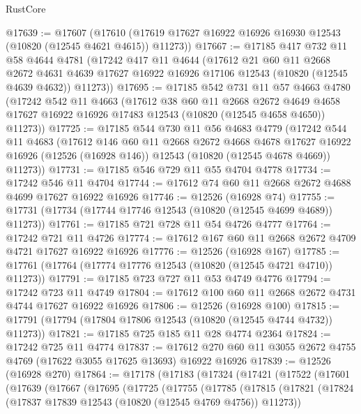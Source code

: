 \begin{lexlean}{RustCore}
\begin{coremodule}
@17639 := @17607
    (@17610 (@17619 @17627 @16922 @16926 @16930 @12543 (@10820 (@12545 @4621 @4615)) @11273))
@17667 := @17185
    @417
    @732
    @11
    @58
    @4644
    @4781
    (@17242
      @417
      @11
      @4644
      (@17612
        @21
        @60
        @11
        @2668
        @2672
        @4631
        @4639
        @17627
        @16922
        @16926
        @17106
        @12543
        (@10820 (@12545 @4639 @4632))
        @11273))
@17695 := @17185
    @542
    @731
    @11
    @57
    @4663
    @4780
    (@17242
      @542
      @11
      @4663
      (@17612
        @38
        @60
        @11
        @2668
        @2672
        @4649
        @4658
        @17627
        @16922
        @16926
        @17483
        @12543
        (@10820 (@12545 @4658 @4650))
        @11273))
@17725 := @17185
    @544
    @730
    @11
    @56
    @4683
    @4779
    (@17242
      @544
      @11
      @4683
      (@17612
        @146
        @60
        @11
        @2668
        @2672
        @4668
        @4678
        @17627
        @16922
        @16926
        (@12526 (@16928 @146))
        @12543
        (@10820 (@12545 @4678 @4669))
        @11273))
@17731 := @17185 @546 @729 @11 @55 @4704 @4778
@17734 := @17242 @546 @11 @4704
@17744 := @17612 @74 @60 @11 @2668 @2672 @4688 @4699 @17627 @16922 @16926
@17746 := @12526 (@16928 @74)
@17755 := @17731 (@17734 (@17744 @17746 @12543 (@10820 (@12545 @4699 @4689)) @11273))
@17761 := @17185 @721 @728 @11 @54 @4726 @4777
@17764 := @17242 @721 @11 @4726
@17774 := @17612 @167 @60 @11 @2668 @2672 @4709 @4721 @17627 @16922 @16926
@17776 := @12526 (@16928 @167)
@17785 := @17761 (@17764 (@17774 @17776 @12543 (@10820 (@12545 @4721 @4710)) @11273))
@17791 := @17185 @723 @727 @11 @53 @4749 @4776
@17794 := @17242 @723 @11 @4749
@17804 := @17612 @100 @60 @11 @2668 @2672 @4731 @4744 @17627 @16922 @16926
@17806 := @12526 (@16928 @100)
@17815 := @17791 (@17794 (@17804 @17806 @12543 (@10820 (@12545 @4744 @4732)) @11273))
@17821 := @17185 @725 @185 @11 @28 @4774 @2364
@17824 := @17242 @725 @11 @4774
@17837 := @17612 @270 @60 @11 @3055 @2672 @4755 @4769 (@17622 @3055 @17625 @13693) @16922 @16926
@17839 := @12526 (@16928 @270)
@17864 := @17178
    (@17183
      (@17324
        (@17421
          (@17522
            (@17601
              (@17639
                (@17667
                  (@17695
                    (@17725
                      (@17755
                        (@17785
                          (@17815
                            (@17821
                              (@17824 (@17837 @17839 @12543 (@10820 (@12545 @4769 @4756)) @11273))

\end{coremodule}
\end{lexlean}
